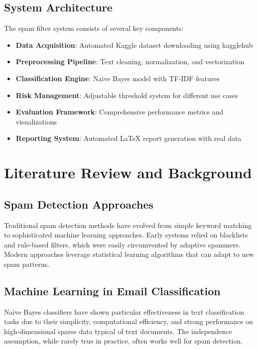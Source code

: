 \documentclass[12pt,a4paper]{article}
\begin{document}
\subsection{System Architecture}

The spam filter system consists of several key components:

\begin{itemize}
    \item \textbf{Data Acquisition}: Automated Kaggle dataset downloading using kagglehub
    \item \textbf{Preprocessing Pipeline}: Text cleaning, normalization, and vectorization
    \item \textbf{Classification Engine}: Naive Bayes model with TF-IDF features
    \item \textbf{Risk Management}: Adjustable threshold system for different use cases
    \item \textbf{Evaluation Framework}: Comprehensive performance metrics and visualizations
    \item \textbf{Reporting System}: Automated LaTeX report generation with real data
\end{itemize}

\section{Literature Review and Background}

\subsection{Spam Detection Approaches}

Traditional spam detection methods have evolved from simple keyword matching to sophisticated machine learning approaches. Early systems relied on blacklists and rule-based filters, which were easily circumvented by adaptive spammers. Modern approaches leverage statistical learning algorithms that can adapt to new spam patterns.

\subsection{Machine Learning in Email Classification}

Naive Bayes classifiers have shown particular effectiveness in text classification tasks due to their simplicity, computational efficiency, and strong performance on high-dimensional sparse data typical of text documents. The independence assumption, while rarely true in practice, often works well for spam detection.
\end{document}
